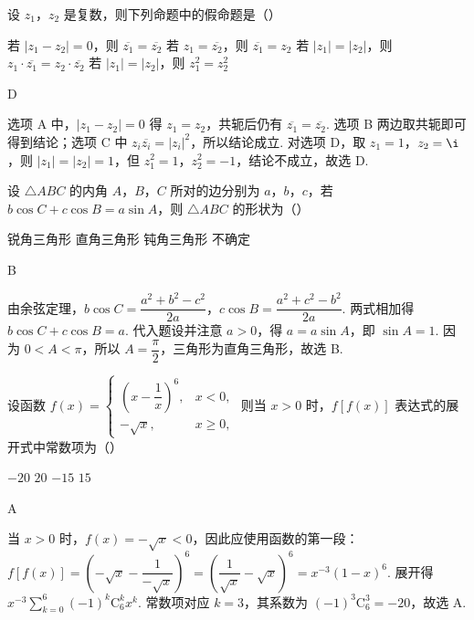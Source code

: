 \begin{problem}
设 \(z_{1}\)，\(z_{2}\) 是复数，则下列命题中的假命题是（\quad）

\choices
    {若 \(\left|z_1-z_2\right|=0\)，则 \(\overline{z_1}=\overline{z_2}\)}
    {若 \(z_1=\overline{z_2}\)，则 \(\overline{z_1}=z_2\)}
    {若 \(\left|z_1\right|=\left|z_2\right|\)，则 \(z_1\cdot\overline{z_1}=z_2\cdot\overline{z_2}\)}
    {若 \(\left|z_1\right|=\left|z_2\right|\)，则 \(z_1^2=z_2^2\)}

\begin{answer}
D
\end{answer}

\begin{solution}
选项 A 中，\(\left|z_1-z_2\right|=0\) 得 \(z_1=z_2\)，共轭后仍有 \(\overline{z_1}=\overline{z_2}\). 选项 B 两边取共轭即可得到结论；选项 C 中 \(z_i\overline{z_i}=\left|z_i\right|^2\)，所以结论成立. 对选项 D，取 \(z_1=1\)，\(z_2=\i\)，则 \(\left|z_1\right|=\left|z_2\right|=1\)，但 \(z_1^2=1\)，\(z_2^2=-1\)，结论不成立，故选 D.
\end{solution}
\end{problem}

\begin{problem}
设 \(\triangle ABC\) 的内角 \(A\)，\(B\)，\(C\) 所对的边分别为 \(a\)，\(b\)，\(c\)，若 \(b\cos C+c\cos B=a\sin A\)，则 \(\triangle ABC\) 的形状为（\quad）

\choices
    {锐角三角形}
    {直角三角形}
    {钝角三角形}
    {不确定}

\begin{answer}
B
\end{answer}

\begin{solution}
由余弦定理，\(b\cos C=\dfrac{a^2+b^2-c^2}{2a}\)，\(c\cos B=\dfrac{a^2+c^2-b^2}{2a}\). 两式相加得 \(b\cos C+c\cos B=a\). 代入题设并注意 \(a>0\)，得 \(a=a\sin A\)，即 \(\sin A=1\). 因为 \(0<A<\pi\)，所以 \(A=\dfrac{\pi}{2}\)，三角形为直角三角形，故选 B.
\end{solution}
\end{problem}

\begin{problem}
设函数 \(f(x)=\begin{cases}
\left(x-\dfrac{1}{x}\right)^6, & x<0,\\
-\sqrt{x}, & x\geqslant0,
\end{cases}\) 则当 \(x>0\) 时，\(f[f(x)]\) 表达式的展开式中常数项为（\quad）

\choices
    {\(-20\)}
    {\(20\)}
    {\(-15\)}
    {\(15\)}

\begin{answer}
A
\end{answer}

\begin{solution}
当 \(x>0\) 时，\(f(x)=-\sqrt{x}<0\)，因此应使用函数的第一段：\(f[f(x)]=\left(-\sqrt{x}-\dfrac{1}{-\sqrt{x}}\right)^6=\left(\dfrac{1}{\sqrt{x}}-\sqrt{x}\right)^6=x^{-3}(1-x)^6\). 展开得 \(x^{-3}\sum_{k=0}^{6}(-1)^k\mathrm C_6^k x^k\). 常数项对应 \(k=3\)，其系数为 \((-1)^3\mathrm C_6^3=-20\)，故选 A.
\end{solution}
\end{problem}

